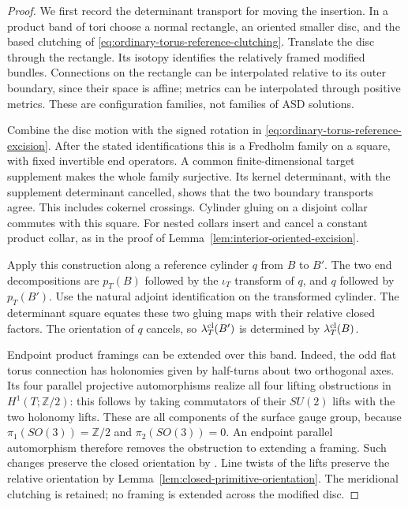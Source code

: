 \documentclass[11pt]{amsart}
\theoremstyle{definition}
\theoremstyle{remark}
\theoremstyle{plain}
\begin{document}
\begin{proof}
We first record the determinant transport for moving the
insertion. In a product band of tori choose a normal
rectangle, an oriented smaller disc, and the based
clutching of
\eqref{eq:ordinary-torus-reference-clutching}.
Translate the disc through the rectangle. Its isotopy
identifies the relatively framed modified bundles.
Connections on the rectangle can be interpolated
relative to its outer boundary, since their space
is affine; metrics can be interpolated through
positive metrics. These are configuration families,
not families of ASD solutions.

Combine the disc motion with the signed rotation in
\eqref{eq:ordinary-torus-reference-excision}.
After the stated identifications this is a Fredholm
family on a square, with fixed invertible end
operators. A common finite-dimensional target
supplement makes the whole family surjective.
Its kernel determinant, with the supplement
determinant cancelled, shows that the two
boundary transports agree. This includes
cokernel crossings. Cylinder gluing on a
disjoint collar commutes with this square.
For nested collars insert and cancel a
constant product collar, as in the proof of
Lemma~\ref{lem:interior-oriented-excision}.

Apply this construction along a reference cylinder
$q$ from $B$ to $B'$. The two end decompositions
are $p_T(B)$ followed by the $\iota_T$ transform
of $q$, and $q$ followed by $p_T(B')$.
Use the natural adjoint identification on the
transformed cylinder. The determinant square
equates these two gluing maps with their
relative closed factors. The orientation
of $q$ cancels, so
$\lambda_T^{\rm cl}(B')$ is determined by
$\lambda_T^{\rm cl}(B)$.

Endpoint product framings can be extended over
this band. Indeed, the odd flat torus connection
has holonomies given by half-turns about two
orthogonal axes. Its four parallel projective
automorphisms realize all four lifting
obstructions in $H^1(T;\mathbb Z/2)$: this
follows by taking commutators of their
$SU(2)$ lifts with the two holonomy lifts.
These are all components of the surface
gauge group, because $\pi_1(SO(3))=\mathbb Z/2$
and $\pi_2(SO(3))=0$.
An endpoint parallel automorphism therefore
removes the obstruction to extending a framing.
Such changes preserve the closed orientation
by \cite[Corollary~3.27]{Donaldson87}.
Line twists of the lifts preserve the relative
orientation by
Lemma~\ref{lem:closed-primitive-orientation}.
The meridional clutching is retained; no
framing is extended across the modified disc.


\end{proof}
\end{document}
